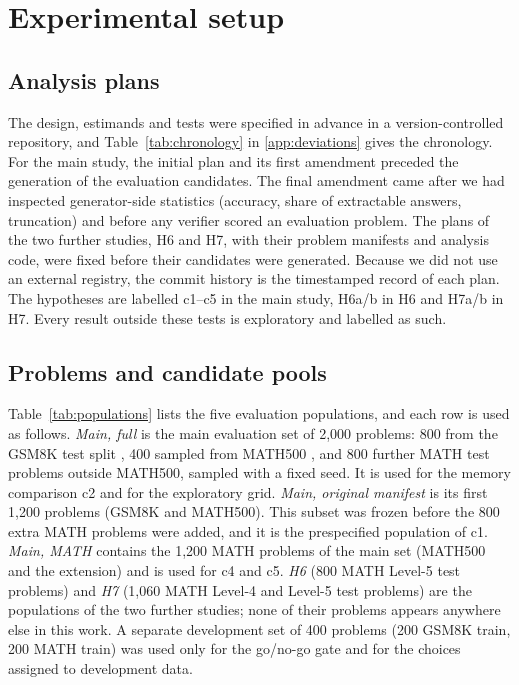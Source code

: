 \section{Experimental setup}\label{sec:setup}

\subsection{Analysis plans}\label{sec:plans}

The design, estimands and tests were specified in advance in a version-controlled
repository, and Table~\ref{tab:chronology} in \ref{app:deviations} gives the chronology.
For the main study, the initial plan and its first amendment preceded the generation of
the evaluation candidates. The final amendment came after we had inspected
generator-side statistics (accuracy, share of extractable answers, truncation) and
before any verifier scored an evaluation problem. The plans of the two further studies, H6 and H7, with their problem manifests and
analysis code, were fixed before their
candidates were generated. Because we did not use an external registry, the commit
history is the timestamped record of each plan. The hypotheses are labelled c1--c5 in
the main study, H6a/b in H6 and H7a/b in H7. Every result outside these
tests is exploratory and labelled as such.

\subsection{Problems and candidate pools}\label{sec:pools}

Table~\ref{tab:populations} lists the five evaluation populations, and each row is
used as follows. \emph{Main, full} is the main evaluation set of 2,000 problems: 800 from
the GSM8K test split \cite{cobbe2021gsm8k}, 400 sampled from MATH500
\cite{lightman2023verify}, and 800 further MATH test problems \cite{hendrycks2021math}
outside MATH500, sampled with a fixed seed. It is used for the memory comparison c2 and
for the exploratory grid. \emph{Main, original manifest} is its first 1,200 problems
(GSM8K and MATH500). This subset was frozen before the 800 extra MATH problems were added,
and it is the prespecified population of c1. \emph{Main, MATH} contains the 1,200 MATH
problems of the main set (MATH500 and the extension) and is used for c4 and c5.
\emph{H6} (800 MATH Level-5 test problems) and \emph{H7} (1,060 MATH Level-4 and
Level-5 test problems) are the populations of the two further studies; none of their
problems appears anywhere else in this work. A separate development set of 400 problems
(200 GSM8K train, 200 MATH train) was used only for the go/no-go gate and for the choices
assigned to development data.

